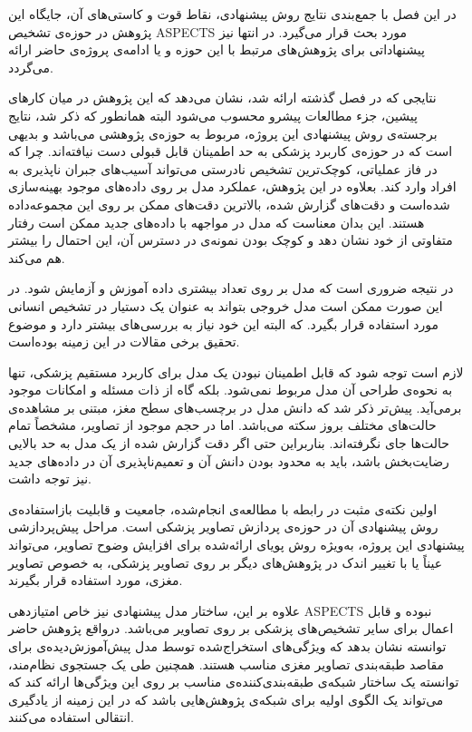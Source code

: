 

در این فصل با جمع‌بندی نتایج روش پیشنهادی، نقاط قوت و کاستی‌های آن، جایگاه این پژوهش در حوزه‌ی تشخیص ASPECTS 
مورد بحث قرار می‌گیرد.
در انتها نیز پیشنهاداتی برای پژوهش‌های مرتبط با این حوزه و یا ادامه‌ی پروژه‌ی حاضر ارائه می‌گردد. 



نتایجی که در فصل گذشته ارائه شد، نشان می‌دهد که این پژوهش در میان کارهای پیشین، جزء مطالعات پیشرو محسوب می‌شود
البته همانطور که ذکر شد، نتایج برجسته‌ی روش پیشنهادی این پروژه، مربوط به حوزه‌ی پژوهشی می‌باشد و بدیهی است که در حوزه‌ی کاربرد پزشکی
به حد اطمینان قابل قبولی دست نیافته‌اند.
چرا که در فاز عملیاتی، کوچک‌ترین تشخیص نادرستی می‌تواند آسیب‌های جبران ناپذیری به افراد وارد کند.
بعلاوه در این پژوهش، عملکرد مدل بر روی داده‌های موجود بهینه‌سازی شده‌است و دقت‌های گزارش شده، بالاترین دقت‌های ممکن بر روی این مجموعه‌داده هستند.
این بدان معناست که مدل در مواجهه با داده‌های جدید ممکن است رفتار متفاوتی از خود نشان دهد و کوچک بودن نمونه‌ی در دسترس آن، این احتمال را بیشتر هم می‌کند.

در نتیجه ضروری است که مدل بر روی تعداد بیشتری داده آموزش و آزمایش شود.
در این صورت ممکن است مدل خروجی بتواند به عنوان یک دستیار در تشخیص انسانی مورد استفاده قرار بگیرد.
که البته این خود نیاز به بررسی‌های بیشتر دارد و موضوع تحقیق برخی مقالات در این زمینه بوده‌است.

لازم است توجه شود که قابل اطمینان نبودن یک مدل برای کاربرد مستقیم پزشکی، تنها به نحوه‌ی طراحی آن مدل مربوط نمی‌شود.
بلکه گاه از ذات مسئله و امکانات موجود برمی‌آید.
پیش‌تر ذکر شد که دانش مدل در برچسب‌های سطح مغز، مبتنی بر مشاهده‌ی حالت‌های مختلف بروز سکته می‌باشد.
اما در حجم موجود از تصاویر، مشخصاً تمام حالت‌ها جای نگرفته‌اند.
بناربراین حتی اگر دقت گزارش شده از یک مدل به حد بالایی رضایت‌بخش باشد، باید به محدود بودن دانش آن و 
تعمیم‌ناپذیری آن در داده‌های جدید نیز توجه داشت.


اولین نکته‌ی مثبت در رابطه با مطالعه‌ی انجام‌شده، 
جامعیت و قابلیت بازاستفاده‌ی روش پیشنهادی آن در حوزه‌ی پردازش تصاویر پزشکی است.
مراحل پیش‌پردازشی پیشنهادی این پروژه، به‌ویژه روش پویای ارائه‌شده برای افزایش وضوح تصاویر، می‌تواند عیناً یا با تغییر اندک در پژوهش‌های دیگر بر روی تصاویر پزشکی، به خصوص تصاویر مغزی،
مورد استفاده قرار بگیرند. 

علاوه بر این، 
ساختار مدل پیشنهادی نیز خاص امتیازدهی ASPECTS نبوده و قابل اعمال برای سایر تشخیص‌های پزشکی بر روی تصاویر می‌باشد.
درواقع پژوهش حاضر توانسته نشان بدهد که ویژگی‌های استخراج‌شده توسط مدل پیش‌آموزش‌دیده‌ی  برای مقاصد طبقه‌بندی تصاویر مغزی مناسب هستند.
همچنین طی یک جستجوی نظام‌مند، توانسته یک ساختار شبکه‌ی طبقه‌بندی‌کننده‌ی مناسب بر روی این ویژگی‌ها ارائه کند که می‌تواند یک الگوی اولیه برای شبکه‌ی پژوهش‌هایی باشد که در این زمینه از یادگیری انتقالی استفاده می‌کنند.

